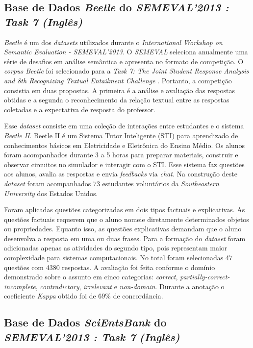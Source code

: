 \subsection{Base de Dados \textit{Beetle} do \textit{SEMEVAL'2013 : Task 7} \textit{(Inglês)}}
\label{beetle-db}

\textit{Beetle} \cite{dzikovska2012} é um dos \textit{datasets} utilizados durante o \textit{International Workshop on Semantic Evaluation - SEMEVAL'2013}. O \textit{SEMEVAL} seleciona anualmente uma série de desafios em análise semântica e apresenta no formato de competição. O \textit{corpus Beetle} foi selecionado para a \textit{Task 7: The Joint Student Response Analysis and 8th Recognizing Textual Entailment Challenge} \cite{dzikovska2013}. Portanto, a competição consistia em duas propostas. A primeira é a análise e avaliação das respostas obtidas e a segunda o reconhecimento da relação textual entre as respostas coletadas e a expectativa de resposta do professor.

Esse \textit{dataset} consiste em uma coleção de interações entre estudantes e o sistema \textit{Beetle II}. Beetle II é um Sistema Tutor Inteligente (STI) para aprendizado de conhecimentos básicos em Eletricidade e Eletrônica do Ensino Médio. Os alunos foram acompanhados durante 3 a 5 horas para preparar materiais, construir e observar circuitos no simulador e interagir com o STI. Esse sistema faz questões aos alunos, avalia as respostas e envia \textit{feedbacks} via \textit{chat}. Na construção deste \textit{dataset} foram acompanhados 73 estudantes voluntários da \textit{Southeastern University} dos Estados Unidos.

Foram aplicadas questões categorizadas em dois tipos factuais e explicativas. As questões factuais requerem que o aluno nomeie diretamente determinados objetos ou propriedades. Equanto isso, as questões explicativas demandam que o aluno desenvolva a resposta em uma ou duas frases. Para a formação do \textit{dataset} foram adicionadas apenas as atividades do segundo tipo, pois representam maior complexidade para sistemas computacionais. No total foram selecionadas 47 questões com 4380 respostas. A avaliação foi feita conforme o domínio demonstrado sobre o assunto em cinco categorias: \textit{correct}, \textit{partially-correct-incomplete}, \textit{contradictory}, \textit{irrelevant} e \textit{non-domain}. Durante a anotação o coeficiente \textit{Kappa} obtido foi de 69\% de concordância.


\subsection{Base de Dados \textit{SciEntsBank} do \textit{SEMEVAL'2013 : Task 7} \textit{(Inglês)}}
\label{scientsbank-db}

